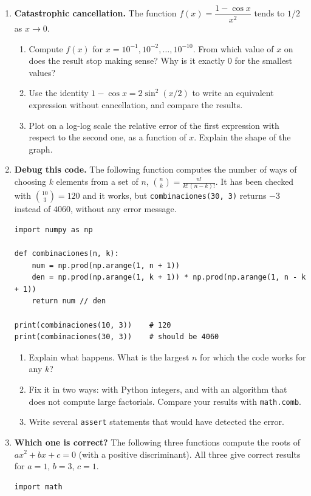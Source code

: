 \begin{enumerate}
\item \textbf{Catastrophic cancellation.} The function $f(x)=\dfrac{1-\cos x}{x^2}$ tends to $1/2$ as $x\to 0$.
\begin{enumerate}
\item Compute $f(x)$ for $x=10^{-1},10^{-2},\ldots,10^{-10}$. From which value of $x$ on does the result stop making sense? Why is it exactly 0 for the smallest values?
\item Use the identity $1-\cos x=2\sin^2(x/2)$ to write an equivalent expression without cancellation, and compare the results.
\item Plot on a log-log scale the relative error of the first expression with respect to the second one, as a function of $x$. Explain the shape of the graph.
\end{enumerate}

\item \label{ej:comb-en} \textbf{Debug this code.} The following function computes the number of ways of choosing $k$ elements from a set of $n$, $\binom{n}{k}=\frac{n!}{k!\,(n-k)!}$. It has been checked with $\binom{10}{3}=120$ and it works, but \texttt{combinaciones(30, 3)} returns $-3$ instead of $4060$, without any error message.
\begin{verbatim}
import numpy as np

def combinaciones(n, k):
    num = np.prod(np.arange(1, n + 1))
    den = np.prod(np.arange(1, k + 1)) * np.prod(np.arange(1, n - k + 1))
    return num // den

print(combinaciones(10, 3))    # 120
print(combinaciones(30, 3))    # should be 4060
\end{verbatim}
\begin{enumerate}
\item Explain what happens. What is the largest $n$ for which the code works for any $k$?
\item Fix it in two ways: with Python integers, and with an algorithm that does not compute large factorials. Compare your results with \texttt{math.comb}.
\item Write several \texttt{assert} statements that would have detected the error.
\end{enumerate}

\item \textbf{Which one is correct?} The following three functions compute the roots of $ax^2+bx+c=0$ (with a positive discriminant). All three give correct results for $a=1$, $b=3$, $c=1$.
\begin{verbatim}
import math


\end{verbatim}
\end{enumerate}
